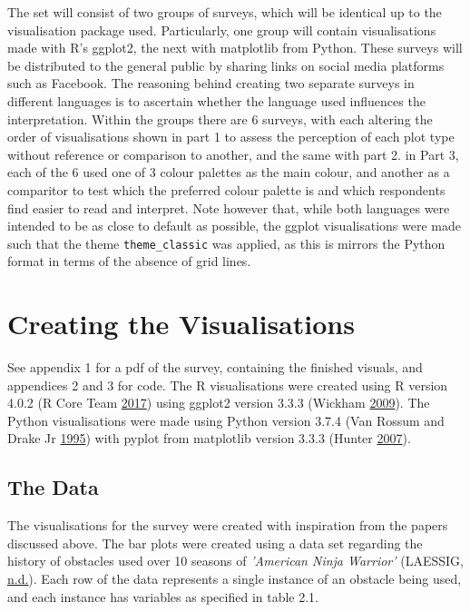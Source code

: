 \documentclass[
  11pt,
]{book}
\begin{document}
The set will consist of two groups of surveys, which will be identical
up to the visualisation package used. Particularly, one group will
contain visualisations made with R's ggplot2, the next with matplotlib
from Python. These surveys will be distributed to the general public by
sharing links on social media platforms such as Facebook. The reasoning
behind creating two separate surveys in different languages is to
ascertain whether the language used influences the interpretation.
Within the groups there are 6 surveys, with each altering the order of
visualisations shown in part 1 to assess the perception of each plot
type without reference or comparison to another, and the same with part
2. in Part 3, each of the 6 used one of 3 colour palettes as the main
colour, and another as a comparitor to test which the preferred colour
palette is and which respondents find easier to read and interpret. Note
however that, while both languages were intended to be as close to
default as possible, the ggplot visualisations were made such that the
theme \texttt{theme\_classic} was applied, as this is mirrors the Python
format in terms of the absence of grid lines.

\section{Creating the Visualisations}

See appendix 1 for a pdf of the survey, containing the finished visuals,
and appendices 2 and 3 for code. The R visualisations were created using
R version 4.0.2 (R Core Team \protect\hyperlink{ref-R}{2017}) using
ggplot2 version 3.3.3 (Wickham \protect\hyperlink{ref-ggplot}{2009}).
The Python visualisations were made using Python version 3.7.4 (Van
Rossum and Drake Jr \protect\hyperlink{ref-py}{1995}) with pyplot from
matplotlib version 3.3.3 (Hunter \protect\hyperlink{ref-matplot}{2007}).

\subsection{The Data}

The visualisations for the survey were created with inspiration from the
papers discussed above. The bar plots were created using a data set
regarding the history of obstacles used over 10 seasons of
\textit{'American Ninja Warrior'} (LAESSIG,
\protect\hyperlink{ref-ANW}{n.d.}). Each row of the data represents a
single instance of an obstacle being used, and each instance has
variables as specified in table 2.1.
\end{document}
